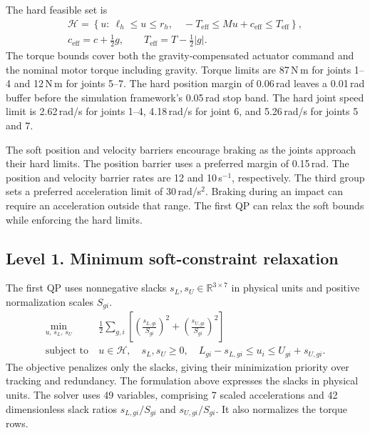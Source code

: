 \documentclass[12pt,a4paper]{article}
\begin{document}
The hard feasible set is
\begin{gather}
  \mathcal H = \left\{ u : \ \ell_h \le u \le r_h, \quad
     -T_{\mathrm{eff}} \le M u + c_{\mathrm{eff}} \le T_{\mathrm{eff}} \right\}, \\
  c_{\mathrm{eff}} = c + \tfrac{1}{2} g, \qquad
  T_{\mathrm{eff}} = T - \tfrac{1}{2} |g| .
\end{gather}
The torque bounds cover both the gravity-compensated actuator command and the
nominal motor torque including gravity. Torque limits are 87\,N\,m for joints 1--4
and 12\,N\,m for joints 5--7. The hard position margin of 0.06\,rad leaves a
0.01\,rad buffer before the simulation framework's 0.05\,rad stop band. The hard joint speed
limit is 2.62\,rad/s for joints 1--4, 4.18\,rad/s for joint 6, and 5.26\,rad/s
for joints 5 and 7.

The soft position and velocity barriers encourage braking as the joints approach
their hard limits. The position barrier uses a preferred margin of 0.15\,rad.
The position and velocity barrier rates are 12 and 10\,s$^{-1}$, respectively.
The third group sets a preferred acceleration limit of 30\,rad/s$^2$. Braking
during an impact can require an acceleration outside that range. The first QP
can relax the soft bounds while enforcing the hard limits.

\subsection{Level 1. Minimum soft-constraint relaxation}
The first QP uses nonnegative slacks $s_L, s_U \in \mathbb{R}^{3\times 7}$ in
physical units and positive normalization scales $S_{gi}$.
\begin{equation}
\begin{aligned}
  \min_{u,\, s_L,\, s_U}\ & \frac{1}{2} \sum_{g,i}
     \left[ \left(\frac{s_{L,gi}}{S_{gi}}\right)^{2}
          + \left(\frac{s_{U,gi}}{S_{gi}}\right)^{2} \right] \\
  \text{subject to}\ & u \in \mathcal H, \quad s_L, s_U \ge 0, \quad
     L_{gi} - s_{L,gi} \le u_i \le U_{gi} + s_{U,gi} .
\end{aligned}
\end{equation}
The objective penalizes only the slacks, giving their minimization priority over
tracking and redundancy. The formulation above expresses the slacks in physical
units. The solver uses 49 variables, comprising 7 scaled accelerations and 42
dimensionless slack ratios $s_{L,gi}/S_{gi}$ and $s_{U,gi}/S_{gi}$. It also
normalizes the torque rows.
\end{document}
